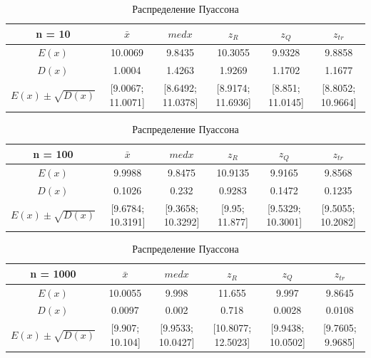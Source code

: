 \documentclass[12pt]{article}
\begin{document}
\begin{center}
\begin{table}
\caption{Распределение Пуассона}
\begin{adjustbox}{width=\textwidth}
\begin{tabular}{| c | c | c | c | c | c |}
\hline
n = 10 & $\bar{x}$ & $med x$ & $z_R$ & $z_Q$ & $z_{tr}$ \\\hline
$E(x)$ & 10.0069 & 9.8435 & 10.3055 & 9.9328 & 9.8858 \\\hline
$D(x)$ & 1.0004 & 1.4263 & 1.9269 & 1.1702 & 1.1677 \\\hline
$E(x) \pm \sqrt{D(x)}$ & [9.0067; 11.0071] & [8.6492; 11.0378] & [8.9174; 11.6936] & [8.851; 11.0145] & [8.8052; 10.9664]\\\hline
\end{tabular}
\end{adjustbox}

\begin{adjustbox}{width=\textwidth}
\begin{tabular}{| c | c | c | c | c | c |}
\hline
n = 100 & $\bar{x}$ & $med x$ & $z_R$ & $z_Q$ & $z_{tr}$ \\\hline
$E(x)$ & 9.9988 & 9.8475 & 10.9135 & 9.9165 & 9.8568 \\\hline
$D(x)$ & 0.1026 & 0.232 & 0.9283 & 0.1472 & 0.1235 \\\hline
$E(x) \pm \sqrt{D(x)}$ & [9.6784; 10.3191] & [9.3658; 10.3292] & [9.95; 11.877] & [9.5329; 10.3001] & [9.5055; 10.2082]\\\hline
\end{tabular}
\end{adjustbox}

\begin{adjustbox}{width=\textwidth}
\begin{tabular}{| c | c | c | c | c | c |}
\hline
n = 1000 & $\bar{x}$ & $med x$ & $z_R$ & $z_Q$ & $z_{tr}$ \\\hline
$E(x)$ & 10.0055 & 9.998 & 11.655 & 9.997 & 9.8645 \\\hline
$D(x)$ & 0.0097 & 0.002 & 0.718 & 0.0028 & 0.0108 \\\hline
$E(x) \pm \sqrt{D(x)}$ & [9.907; 10.104] & [9.9533; 10.0427] & [10.8077; 12.5023] & [9.9438; 10.0502] & [9.7605; 9.9685]\\\hline
\end{tabular}
\end{adjustbox}

\end{table}


\end{center}
\end{document}
